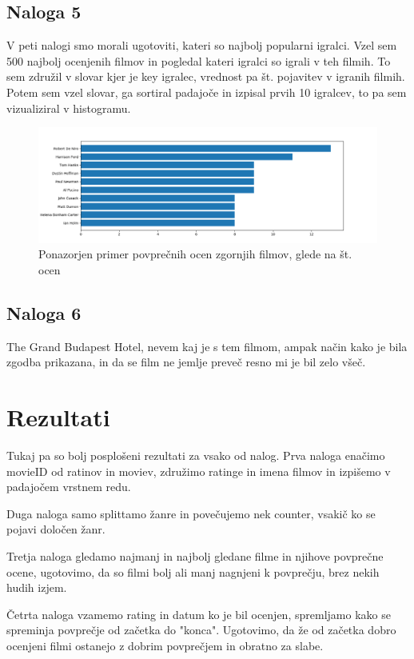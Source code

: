 \documentclass[a4paper,11pt]{article}
\begin{document}
\subsection{Naloga 5}
V peti nalogi smo morali ugotoviti, kateri so najbolj popularni igralci. Vzel sem 500 najbolj ocenjenih filmov in pogledal kateri igralci so igrali v teh filmih. To sem združil v slovar kjer je key igralec, vrednost pa št. pojavitev v igranih filmih. Potem sem vzel slovar, ga sortiral padajoče in izpisal prvih 10 igralcev, to pa sem vizualiziral v histogramu. 

\begin{figure}[htbp]
	\includegraphics[scale=0.55]{../slike/pop_actors.png}
	\caption{Ponazorjen primer povprečnih ocen zgornjih filmov, glede na št. ocen}
	\label{pop_act}
\end{figure}


\subsection{Naloga 6}
The Grand Budapest Hotel, nevem kaj je s tem filmom, ampak način kako je bila zgodba prikazana, in da se film ne jemlje preveč resno mi je bil zelo všeč.
\pagebreak


\section{Rezultati}

Tukaj pa so bolj posplošeni rezultati za vsako od nalog.
  Prva naloga enačimo movieID od ratinov in moviev, združimo ratinge in imena filmov in izpišemo v padajočem vrstnem redu.
  
  Duga naloga samo splittamo žanre in povečujemo nek counter, vsakič ko se pojavi določen žanr.
  
  Tretja naloga gledamo najmanj in najbolj gledane filme in njihove povprečne ocene, ugotovimo, da so filmi bolj ali manj nagnjeni k povprečju, brez nekih hudih izjem.
  
  Četrta naloga vzamemo rating in datum ko je bil ocenjen, spremljamo kako se spreminja povprečje od začetka do "konca". Ugotovimo, da že od začetka dobro ocenjeni filmi ostanejo z dobrim povprečjem in obratno za slabe.
  
\end{document}
